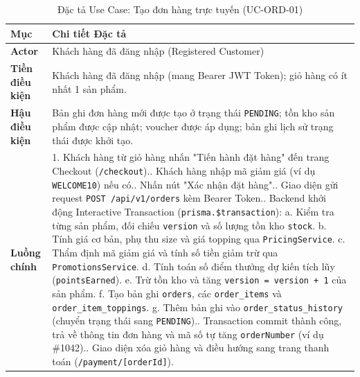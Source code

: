 \begin{table}[htbp]
\centering
\small
\caption{Đặc tả Use Case: Tạo đơn hàng trực tuyến (UC-ORD-01)}
\label{tab:uc-spec-order}
\begin{tabularx}{\textwidth}{p{2.8cm}X}
\toprule
\textbf{Mục} & \textbf{Chi tiết Đặc tả} \\
\midrule
\textbf{Actor} & Khách hàng đã đăng nhập (Registered Customer) \\
\midrule
\textbf{Tiền điều kiện} & Khách hàng đã đăng nhập (mang Bearer JWT Token); giỏ hàng có ít nhất 1 sản phẩm. \\
\midrule
\textbf{Hậu điều kiện} & Bản ghi đơn hàng mới được tạo ở trạng thái \texttt{PENDING}; tồn kho sản phẩm được cập nhật; voucher được áp dụng; bản ghi lịch sử trạng thái được khởi tạo. \\
\midrule
\textbf{Luồng chính} & 
1. Khách hàng từ giỏ hàng nhấn "Tiến hành đặt hàng" đến trang Checkout (\texttt{/checkout}).\newline
2. Khách hàng nhập mã giảm giá (ví dụ \texttt{WELCOME10}) nếu có.\newline
3. Nhấn nút "Xác nhận đặt hàng".\newline
4. Giao diện gửi request \texttt{POST /api/v1/orders} kèm Bearer Token.\newline
5. Backend khởi động Interactive Transaction (\texttt{prisma.\$transaction}):\newline
\quad a. Kiểm tra từng sản phẩm, đối chiếu \texttt{version} và số lượng tồn kho \texttt{stock}.\newline
\quad b. Tính giá cơ bản, phụ thu size và giá topping qua \texttt{PricingService}.\newline
\quad c. Thẩm định mã giảm giá và tính số tiền giảm trừ qua \texttt{PromotionsService}.\newline
\quad d. Tính toán số điểm thưởng dự kiến tích lũy (\texttt{pointsEarned}).\newline
\quad e. Trừ tồn kho và tăng \texttt{version = version + 1} của sản phẩm.\newline
\quad f. Tạo bản ghi \texttt{orders}, các \texttt{order\_items} và \texttt{order\_item\_toppings}.\newline
\quad g. Thêm bản ghi vào \texttt{order\_status\_history} (chuyển trạng thái sang \texttt{PENDING}).\newline
6. Transaction commit thành công, trả về thông tin đơn hàng và mã số tự tăng \texttt{orderNumber} (ví dụ \#1042).\newline
7. Giao diện xóa giỏ hàng và điều hướng sang trang thanh toán (\texttt{/payment/[orderId]}). \\

\end{tabularx}
\end{table}
